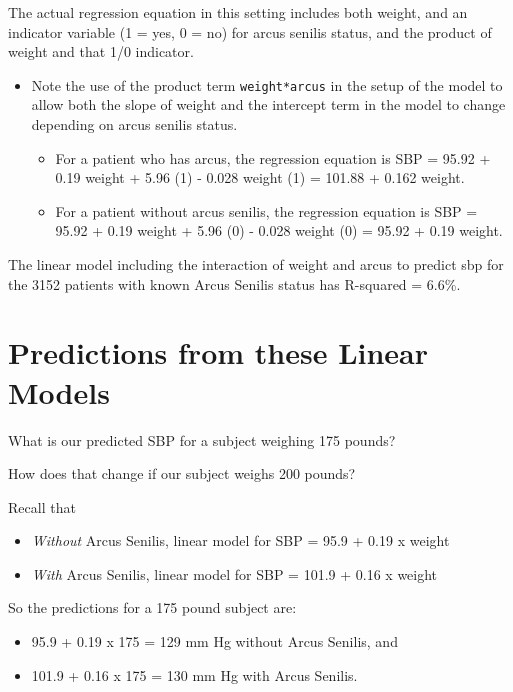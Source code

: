 \documentclass[
]{book}
\providecommand{\tightlist}{%
  \setlength{\itemsep}{0pt}\setlength{\parskip}{0pt}}
\begin{document}
The actual regression equation in this setting includes both weight, and an indicator variable (1 = yes, 0 = no) for arcus senilis status, and the product of weight and that 1/0 indicator.

\begin{itemize}
\tightlist
\item
  Note the use of the product term \texttt{weight*arcus} in the setup of the model to allow both the slope of weight and the intercept term in the model to change depending on arcus senilis status.

  \begin{itemize}
  \tightlist
  \item
    For a patient who has arcus, the regression equation is SBP = 95.92 + 0.19 weight + 5.96 (1) - 0.028 weight (1) = 101.88 + 0.162 weight.
  \item
    For a patient without arcus senilis, the regression equation is SBP = 95.92 + 0.19 weight + 5.96 (0) - 0.028 weight (0) = 95.92 + 0.19 weight.
  \end{itemize}
\end{itemize}

The linear model including the interaction of weight and arcus to predict sbp for the 3152 patients with known Arcus Senilis status has R-squared = 6.6\%.

\hypertarget{predictions-from-these-linear-models}{%
\section{Predictions from these Linear Models}\label{predictions-from-these-linear-models}}

What is our predicted SBP for a subject weighing 175 pounds?

How does that change if our subject weighs 200 pounds?

Recall that

\begin{itemize}
\tightlist
\item
  \emph{Without} Arcus Senilis, linear model for SBP = 95.9 + 0.19 x weight
\item
  \emph{With} Arcus Senilis, linear model for SBP = 101.9 + 0.16 x weight
\end{itemize}

So the predictions for a 175 pound subject are:

\begin{itemize}
\item
  95.9 + 0.19 x 175 = 129 mm Hg without Arcus Senilis, and
\item
  101.9 + 0.16 x 175 = 130 mm Hg with Arcus Senilis.
\end{itemize}
\end{document}
